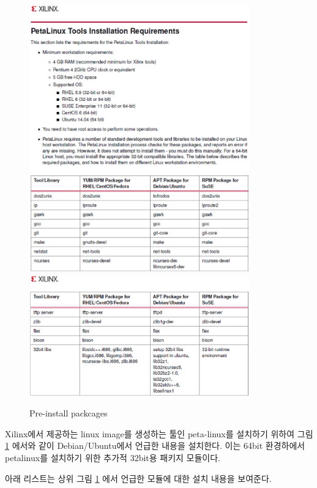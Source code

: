 \documentclass[11pt
  , a4paper
  , article
  , oneside
]{memoir}
\begin{document}
\begin{figure}[h!]
	\centering
	\includegraphics[width=0.85\textwidth]{./images/preinstall_2.eps}
	\includegraphics[width=0.85\textwidth]{./images/preinstall_3.eps}
	\caption{Pre-install packcages}
	\label{fig:preinstall_2} 
\end{figure}

\clearpage


Xilinx에서 제공하는 linux image를 생성하는 툴인 peta-linux를 설치하기 위하여 그림 \ref{fig:preinstall_2} 에서와 같이 Debian/Ubuntu에서 언급한 내용을 설치한다. 이는 64bit 환경하에서 petalinux를 설치하기 위한 추가적 32bit용 패키지 모듈이다.

아래 리스트는 상위 그림 \ref{fig:preinstall_2} 에서 언급한 모듈에 대한 설치 내용을 보여준다.
\end{document}
